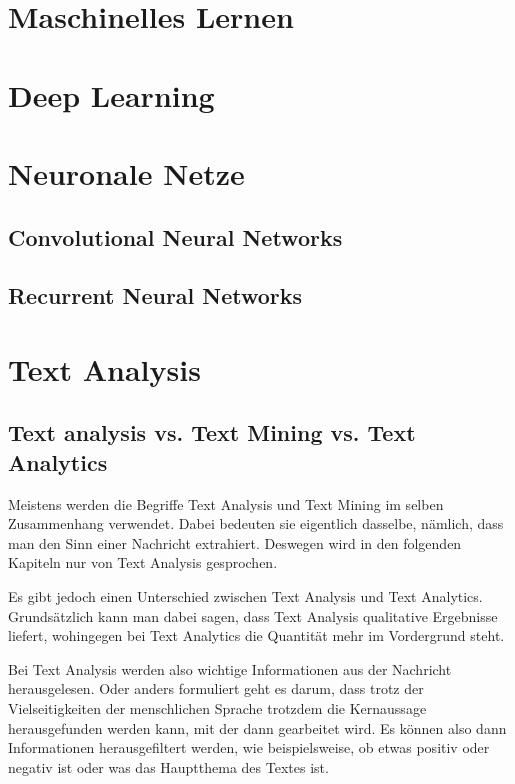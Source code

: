 \section{Maschinelles Lernen}


\section{Deep Learning}


\section{Neuronale Netze}
\subsection{Convolutional Neural Networks}

\subsection{Recurrent Neural Networks}


\section{Text Analysis}

\subsection{Text analysis vs. Text Mining vs. Text Analytics}

Meistens werden die Begriffe Text Analysis und Text Mining im selben Zusammenhang verwendet.
Dabei bedeuten sie eigentlich dasselbe, nämlich, dass man den Sinn einer Nachricht extrahiert.
Deswegen wird in den folgenden Kapiteln nur von Text Analysis gesprochen.

Es gibt jedoch einen Unterschied zwischen Text Analysis und Text Analytics.
Grundsätzlich kann man dabei sagen, dass Text Analysis qualitative Ergebnisse liefert, wohingegen bei Text Analytics die Quantität mehr im Vordergrund steht.\cite{textAnalysisMonkeylearn, machineLearningTextAnalysis}

Bei Text Analysis werden also wichtige Informationen aus der Nachricht herausgelesen.
Oder anders formuliert geht es darum, dass trotz der Vielseitigkeiten der menschlichen Sprache trotzdem die Kernaussage herausgefunden werden kann, mit der dann gearbeitet wird.
Es können also dann Informationen herausgefiltert werden, wie beispielsweise, ob etwas positiv oder negativ ist oder was das Hauptthema des Textes ist.\cite{textAnalysisMonkeylearn, machineLearningTextAnalysis}

